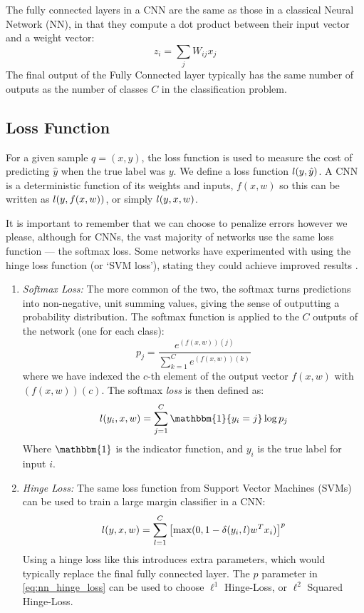   The fully connected layers in a CNN are the same as those in a classical
  Neural Network (NN), in that they compute a dot product between their input
  vector and a weight vector:
  \begin{equation}
    z_i = \sum_{j} W_{ij}x_j
  \end{equation}
  The final output of the Fully Connected layer typically has the same number
  of outputs as the number of classes $C$ in the classification problem.

\subsection{Loss Function}
  For a given sample $q=(x, y)$, the loss
  function is used to measure the cost of predicting $\hat{y}$ when the
  true label was $y$. We define a loss function $l (y, \hat{y})$. 
  A CNN is a deterministic
  function of its weights and inputs, $f(x,w)$ so this can be written as $l
  (y, f(x,w))$, or simply $l(y, x, w)$.
  
  It is important to remember that we can choose
  to penalize errors however we please, although for CNNs, the vast majority of
  networks use the same loss function --- the softmax loss. Some networks have
  experimented with using the hinge loss function (or `SVM loss'), stating they
  could achieve improved results \citep{gu_recent_2015,tang_deep_2013}. 
  \begin{enumerate}

  \item \emph{Softmax Loss:} The more common of the two, the softmax turns
    predictions into non-negative, unit summing values, giving the sense of
    outputting a probability distribution. The softmax function is applied to
    the $C$ outputs of the network (one for each class):
    \begin{equation}
      p_j = \frac{e^{(f(x, w))(j)}}{\sum\limits_{k=1}^{C}e^{(f(x,w))(k)}}
    \end{equation}
    where we have indexed the $c$-th element of the output vector $f(x,w)$ with
      $(f(x,w))(c)$. The softmax \emph{loss} is then defined as:
    \begin{equation}
      \loss (y_i, x, w)
      = \sum_{j=1}^{C} \mathbbm{1}\{y_i=j\} \log p_j
    \end{equation}
    Where $\mathbbm{1}$ is the indicator function, and $y_i$ is the true label
    for input $i$.

  \item \emph{Hinge Loss:} The same loss function from Support Vector
    Machines (SVMs) can be used to train a large margin classifier in a CNN:\@
    \begin{equation}
      l(y,x,w) = \sum_{l=1}^{C} 
        {\left[ \max(0, 1 - \delta(y_i,l) w^{T}x_{i}) \right]}^p \label{eq:nn_hinge_loss}
    \end{equation}
    Using a hinge loss like this introduces extra parameters, which would
    typically replace the final fully connected layer. The $p$ parameter in
    \autoref{eq:nn_hinge_loss} can be used to choose $\ell^1$ Hinge-Loss, or
    $\ell^2$ Squared Hinge-Loss. 

  \end{enumerate}
  

